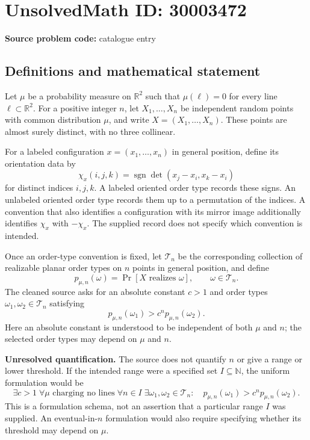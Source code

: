\documentclass[11pt]{article}
\newcommand{\N}{\mathbb{N}}
\newcommand{\R}{\mathbb{R}}
\begin{document}
\section*{UnsolvedMath ID: 30003472}
\textbf{Source problem code:} catalogue entry
\subsection{Definitions and mathematical statement}
Let \(\mu\) be a probability measure on \(\R^2\) such that \(\mu(\ell)=0\) for every line \(\ell\subset\R^2\). For a positive integer \(n\), let \(X_1,\ldots,X_n\) be independent random points with common distribution \(\mu\), and write \(X=(X_1,\ldots,X_n)\). These points are almost surely distinct, with no three collinear.

For a labeled configuration \(x=(x_1,\ldots,x_n)\) in general position, define its orientation data by
\[
\chi_x(i,j,k)=\operatorname{sgn}\det(x_j-x_i,x_k-x_i)
\]
for distinct indices \(i,j,k\). A labeled oriented order type records these signs. An unlabeled oriented order type records them up to a permutation of the indices. A convention that also identifies a configuration with its mirror image additionally identifies \(\chi_x\) with \(-\chi_x\). The supplied record does not specify which convention is intended.

Once an order-type convention is fixed, let \(\mathcal T_n\) be the corresponding collection of realizable planar order types on \(n\) points in general position, and define
\[
p_{\mu,n}(\omega)=\Pr[X\text{ realizes }\omega],\qquad \omega\in\mathcal T_n.
\]
The cleaned source asks for an absolute constant \(c>1\) and order types \(\omega_1,\omega_2\in\mathcal T_n\) satisfying
\[
p_{\mu,n}(\omega_1)>c^n p_{\mu,n}(\omega_2).
\]
Here an absolute constant is understood to be independent of both \(\mu\) and \(n\); the selected order types may depend on \(\mu\) and \(n\).

\textbf{Unresolved quantification.} The source does not quantify \(n\) or give a range or lower threshold. If the intended range were a specified set \(I\subseteq\N\), the uniform formulation would be
\[
\exists c>1\;\forall\mu\text{ charging no lines}\;\forall n\in I\;\exists\omega_1,\omega_2\in\mathcal T_n:
\quad p_{\mu,n}(\omega_1)>c^n p_{\mu,n}(\omega_2).
\]
This is a formulation schema, not an assertion that a particular range \(I\) was supplied. An eventual-in-\(n\) formulation would also require specifying whether its threshold may depend on \(\mu\).
\end{document}
